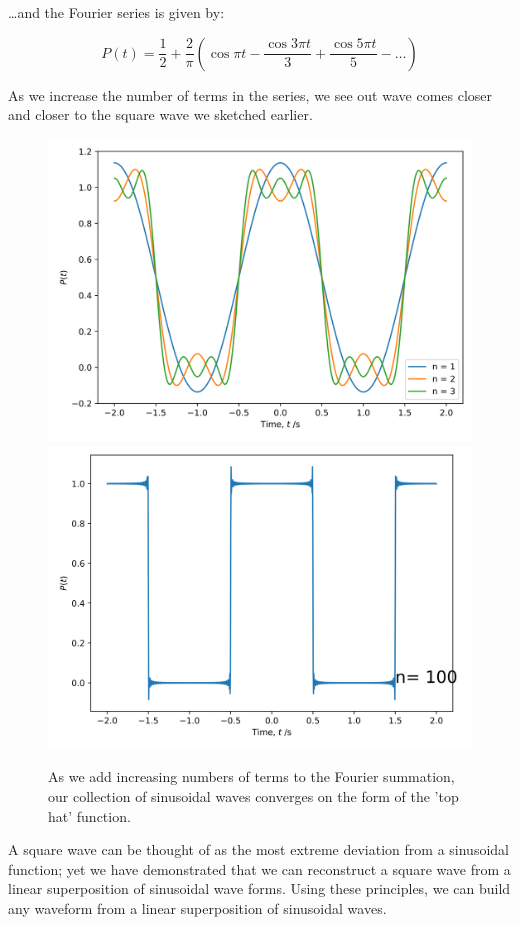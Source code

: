 \documentclass[
]{book}
\begin{document}
\ldots and the Fourier series is given by:

\begin{equation}
P(t) = \frac{1}{2} + \frac{2}{\pi}\left(\cos\pi t - \frac{\cos3\pi t}{3} + \frac{\cos5\pi t}{5} -\ldots\right)
\end{equation}

As we increase the number of terms in the series, we see out wave comes closer and closer to the square wave we sketched earlier.

\begin{figure}

{\centering \includegraphics[width=0.7\linewidth]{visualisations/ch11-fouriersum5} \includegraphics[width=0.7\linewidth]{visualisations/ch11-fouriersum100} 

}

\caption{As we add increasing numbers of terms to the Fourier summation, our collection of sinusoidal waves converges on the form of the 'top hat' function.}\label{fig:ch11-fouriersum5}
\end{figure}

A square wave can be thought of as the most extreme deviation from a sinusoidal function; yet we have demonstrated that we can reconstruct a square wave from a linear superposition of sinusoidal wave forms. Using these principles, we can build any waveform from a linear superposition of sinusoidal waves.
\end{document}
